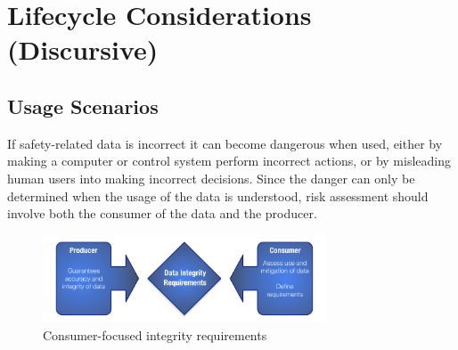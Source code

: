 %
%
\section{Lifecycle Considerations (Discursive)} \label{bkm:lifecycle}


\subsection{Usage Scenarios}
If safety-related data is incorrect it can become dangerous when used, either by making a computer or control system perform incorrect actions, or by misleading human users into making incorrect decisions. Since the danger can only be determined when the usage of the data is understood, risk assessment should involve both the consumer of the data and the producer.

\begin{figure}[htbp]
  \centering
  \includegraphics[width=0.75\textwidth]{images/producerconsumer}
  \caption{Consumer-focused integrity requirements}
  \label{fig:producerconsumer}
\end{figure}

